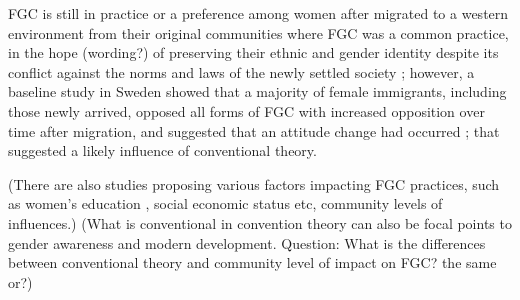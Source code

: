 \documentclass[12pt,]{article}
\begin{document}







FGC is still in practice or a preference among women after migrated to a western environment from their original communities where FGC was a common practice, in the hope (wording?) of preserving their ethnic and gender identity despite its conflict against the  norms and laws of the newly settled society \cite{}; however, a baseline study in Sweden showed that a majority of female immigrants, including those newly arrived, opposed all forms of FGC with increased opposition over time after migration, and suggested that an attitude change had occurred \cite{WahlJohn17}; that suggested a likely influence of conventional theory.


(There are also studies proposing various factors impacting FGC practices, such as women's education \cite{KandNwak09,VanMeek15}, social economic status \cite{} etc, community levels of influences.) (What is conventional in convention theory can also be focal points to gender awareness and modern development.  Question:  What is the differences between conventional theory and community level of impact on FGC? the same or?)  



\end{document}
